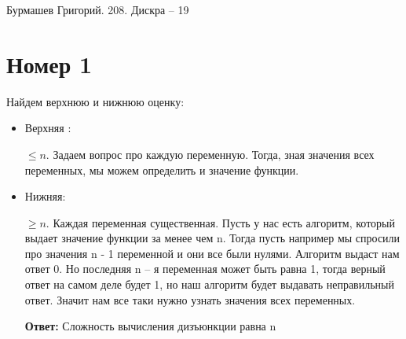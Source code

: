\documentclass[a4paper,12pt]{article}
\author{Бурмашев Григорий, БПМИ-208}
\title{}
\date{\today}
\begin{document}
\begin{center}
Бурмашев Григорий. 208. Дискра -- 19
\end{center}
\section*{Номер 1}
Найдем верхнюю и нижнюю оценку:
\begin{itemize}
\item Верхняя : 

$\leq n$. Задаем вопрос про каждую переменную. Тогда, зная значения всех переменных, мы можем определить и значение функции.

\item Нижняя:

$\geq n$. Каждая переменная существенная. Пусть у нас есть алгоритм, который выдает значение функции за менее чем n. Тогда пусть например мы спросили про значения n - 1 переменной и они все были нулями. Алгоритм выдаст нам ответ 0. Но последняя n -- я переменная может быть равна 1, тогда верный ответ на самом деле будет 1, но наш алгоритм будет выдавать неправильный ответ. Значит нам все таки нужно узнать значения всех переменных. 
\begin{center}
\textbf{Ответ: } Сложность вычисления дизъюнкции равна n
\end{center}
\end{itemize}
\end{document}
